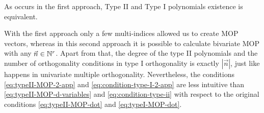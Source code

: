 \documentclass[portrait,final,a0paper,fontscale=0.38]{baposter}
\begin{document}
\begin{poster}
{  As occurs in the first approach, Type II and Type I polynomials existence is equivalent.%
%
%  

  With the first approach only a few multi-indices allowed us to create MOP vectors, whereas in this second approach it is possible to calculate bivariate MOP with any $\vec n\in\mathbb{N}^r$. Apart from that, the degree of the type II polynomials and the number of orthogonality conditions in type I orthogonality is exactly $|\vec n|$, just like happens in univariate multiple orthogonality. Nevertheless, the conditions \eqref{eq:typeII-MOP-2-app} and \eqref{eq:condition-type-I-2-app} are less intuitive than \eqref{eq:typeII-MOP-d-variables} and \eqref{eq:condition-type-ii} with respect to the original conditions \eqref{eq:typeII-MOP-dot} and \eqref{eq:typeI-MOP-dot}.


\vspace{2pt}

}
%



\end{poster}
\end{document}
